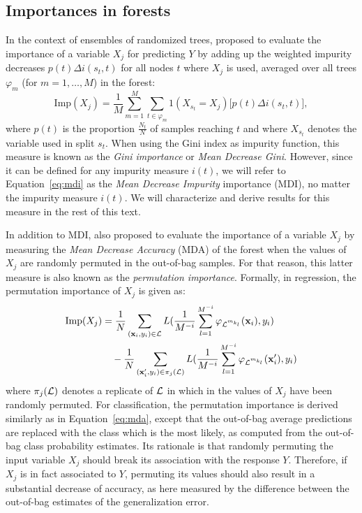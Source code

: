 \subsection{Importances in forests}

In the context of ensembles of randomized trees,
\cite{breiman:2001,breiman:2002} proposed to evaluate the importance of
a variable $X_j$  for predicting  $Y$ by adding up the weighted impurity decreases $p(t) \Delta
i(s_t, t)$ for all nodes $t$ where $X_j$ is used, averaged over all trees $\varphi_m$ (for $m=1,\dots,M$)
in the forest:
\begin{equation}\label{eq:mdi}
\text{Imp}(X_j) = \frac{1}{M} \sum_{m=1}^M \sum_{t \in \varphi_{m}} 1(X_{s_t} = X_j) \Big[ p(t) \Delta i(s_t, t) \Big],
\end{equation}
where $p(t)$ is the proportion $\tfrac{N_t}{N}$ of samples
reaching $t$ and where $X_{s_t}$ denotes the variable used in split $s_t$. When
using the Gini index as impurity function, this measure is known as the
\textit{Gini importance} or \textit{Mean Decrease Gini}. However, since it can
be defined for any impurity measure $i(t)$, we will refer to Equation~\ref{eq:mdi}
as the \textit{Mean Decrease Impurity} importance (MDI), no matter the impurity
measure $i(t)$. We will characterize and derive results for this measure in the
rest of this text.

In addition to MDI, \cite{breiman:2001,breiman:2002} also proposed to evaluate
the importance of a variable $X_j$ by measuring the \textit{Mean Decrease
Accuracy} (MDA) of the forest when the values of $X_j$ are randomly permuted in
the out-of-bag samples. For that reason, this
latter measure is also known as the \textit{permutation importance}. Formally,
in regression, the permutation importance of $X_j$ is given as:
\begin{align}\label{eq:mda}
\text{Imp}(X_j) &= \frac{1}{N} \sum_{(\mathbf{x}_i,y_i) \in {\cal L}} L(\frac{1}{M^{-i}} \sum_{l=1}^{M^{-i}} \varphi_{{\cal L}^{m_{k_l}}}(\mathbf{x}_i), y_i) \\ \nonumber
                &\quad - \frac{1}{N} \sum_{(\mathbf{x}_i^\prime,y_i) \in \pi_j({\cal L})} L(\frac{1}{M^{-i}} \sum_{l=1}^{M^{-i}} \varphi_{{\cal L}^{m_{k_l}}}(\mathbf{x}_i^\prime), y_i)
\end{align}
where $\pi_j({\cal L})$ denotes a replicate of ${\cal L}$ in which in the
values of $X_j$ have been randomly permuted. For classification, the
permutation importance is derived similarly as in Equation~\ref{eq:mda},
except  that the out-of-bag average predictions are
replaced with the class which is the most likely, as computed from the out-of-bag
class probability estimates. Its rationale is that randomly permuting the
input variable $X_j$ should break its association with the response $Y$. Therefore,
if $X_j$ is in fact associated to $Y$, permuting its values should also result
in a substantial decrease of accuracy, as here measured by the difference between
the out-of-bag estimates of the generalization error.


